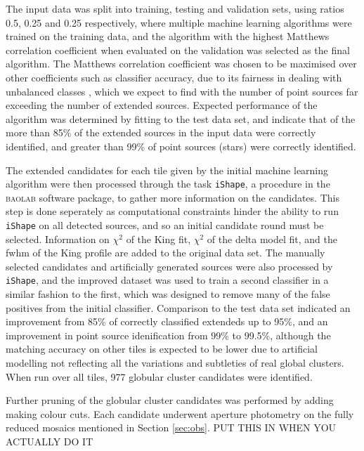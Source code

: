 \documentclass[useAMS,usenatbib]{mn2e}
\begin{document}
The input data was split into training, testing and validation sets, using ratios 0.5, 0.25 and 0.25 respectively, where multiple machine learning algorithms were trained on the training data, and the algorithm with the highest Matthews correlation coefficient\citep{matthews1975comparison} when evaluated on the validation was selected as the final algorithm. The Matthews correlation coefficient was chosen to be maximised over other coefficients such as classifier accuracy, due to its fairness in dealing with unbalanced classes \citep{Baldi2000, Jurman2012}, which we expect to find with the number of point sources far exceeding the number of extended sources. Expected performance of the algorithm was determined by fitting to the test data set, and indicate that of the more than 85\% of the extended sources in the input data were correctly identified, and greater than 99\% of point sources (stars) were correctly identified.

The extended candidates for each tile given by the initial machine learning algorithm were then processed through the task \verb|iShape|, a procedure in the \textsc{baolab} software package, to gather more information on the candidates. This step is done seperately as computational constraints hinder the ability to run \verb|iShape| on all detected sources, and so an initial candidate round must be selected. Information on $\chi^2$ of the King fit, $\chi^2$ of the delta model fit, and the fwhm of the King profile are added to the original data set. The manually selected candidates and artificially generated sources were also processed by \verb|iShape|, and the improved dataset was used to train a second classifier in a similar fashion to the first, which was designed to remove many of the false positives from the initial classifier. Comparison to the test data set indicated an improvement from 85\% of correctly classified extendeds up to 95\%, and an improvement in point source idenification from 99\% to 99.5\%, although the matching accuracy on other tiles is expected to be lower due to artificial modelling not reflecting all the variations and subtleties of real global clusters. When run over all tiles, 977 globular cluster candidates were identified.

Further pruning of the globular cluster candidates was performed by adding making colour cuts. Each candidate underwent aperture photometry on the fully reduced mosaics mentioned in Section \ref{sec:obs}. {\color{blue} PUT THIS IN WHEN YOU ACTUALLY DO IT} 
\end{document}
